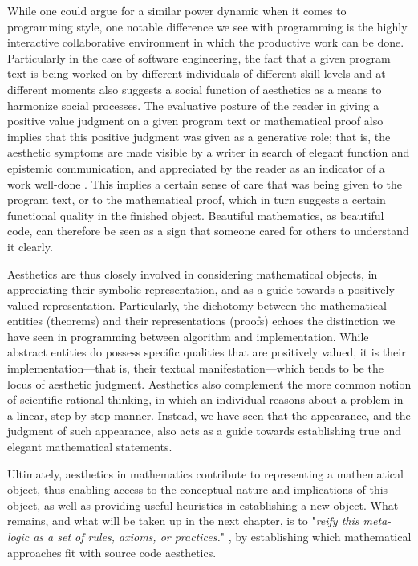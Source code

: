While one could argue for a similar power dynamic when it comes to programming style, one notable difference we see with programming is the highly interactive collaborative environment in which the productive work can be done. Particularly in the case of software engineering, the fact that a given program text is being worked on by different individuals of different skill levels and at different moments also suggests a social function of aesthetics as a means to harmonize social processes. The evaluative posture of the reader in giving a positive value judgment on a given program text or mathematical proof also implies that this positive judgment was given as a generative role; that is, the aesthetic symptoms are made visible by a writer in search of elegant function and epistemic communication, and appreciated by the reader as an indicator of a work well-done \citep{tomov_role_2016a}. This implies a certain sense of care that was being given to the program text, or to the mathematical proof, which in turn suggests a certain functional quality in the finished object. Beautiful mathematics, as beautiful code, can therefore be seen as a sign that someone cared for others to understand it clearly.

\spacersmall

Aesthetics are thus closely involved in considering mathematical objects, in appreciating their symbolic representation, and as a guide towards a positively-valued representation. Particularly, the dichotomy between the mathematical entities (theorems) and their representations (proofs) echoes the distinction we have seen in programming between algorithm and implementation. While abstract entities do possess specific qualities that are positively valued, it is their implementation—that is, their textual manifestation—which tends to be the locus of aesthetic judgment. Aesthetics also complement the more common notion of scientific rational thinking, in which an individual reasons about a problem in a linear, step-by-step manner. Instead, we have seen that the appearance, and the judgment of such appearance, also acts as a guide towards establishing true and elegant mathematical statements.

Ultimately, aesthetics in mathematics contribute to representing a mathematical object, thus enabling access to the conceptual nature and implications of this object, as well as providing useful heuristics in establishing a new object. What remains, and what will be taken up in the next chapter, is to "\emph{reify this meta-logic as a set of rules, axioms, or practices.}" \citep{root-bernstein_aesthetic_2002}, by establishing which mathematical approaches fit with source code aesthetics.

